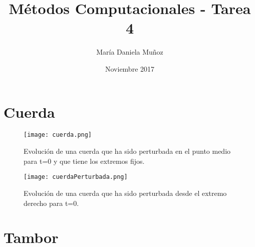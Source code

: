 \documentclass{article}
\title{Métodos Computacionales - Tarea 4}
\author{María Daniela Muñoz}
\date{Noviembre 2017}
\begin{document}
\maketitle

\section{Cuerda}

\begin{figure}[h]
\begin{center}
\texttt{[image: cuerda.png]}
\caption{Evolución de una cuerda que ha sido perturbada en el punto medio para t=0 y que tiene los extremos fijos.} \label{cuerda}
\end{center}
\end{figure}

\begin{figure}[h]
\begin{center}
\texttt{[image: cuerdaPerturbada.png]}
\caption{Evolución de una cuerda que ha sido perturbada desde el extremo derecho para t=0.} \label{cuerdaP}
\end{center}
\end{figure}



\clearpage
\section{Tambor}
\end{document}
